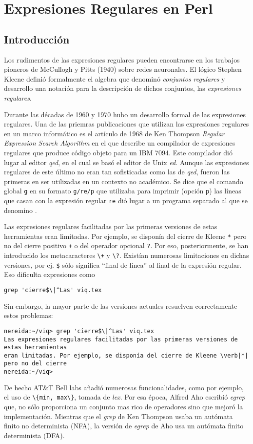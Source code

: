 \chapter{Expresiones Regulares en Perl}
\label{chapter:regulares}

\section{Introducción}
Los rudimentos de las expresiones regulares pueden encontrarse
en los trabajos pioneros de McCullogh y Pitts (1940) sobre redes neuronales.
El lógico Stephen Kleene definió formalmente el algebra que denominó
\emph{conjuntos regulares} y desarrollo una notación para la descripción de dichos conjuntos, las \emph{expresiones regulares}.

Durante las décadas de 1960 y 1970 hubo un desarrollo formal de las expresiones regulares.
Una de las priemras publicaciones que utilizan las expresiones
regulares en un marco informático es el artículo de 1968 de Ken
Thompson \emph{Regular Expression Search Algorithm} en el que describe
un compilador de expresiones regulares que produce código objeto para
un IBM 7094.
Este compilador dió lugar al editor \emph{qed}, en el cual se basó el
editor de Unix
\emph{ed}. Aunque las expresiones regulares de este último no eran
tan sofisticadas como las de \emph{qed}, fueron las primeras en ser
utilizadas en un contexto no académico.
Se dice que el comando global \verb|g| en su formato \verb|g/re/p| que utilizaba 
para imprimir (opción \verb|p|) las líneas que casan con la expresión regular  \verb|re|
dió lugar a un programa separado al que se denomino .

Las expresiones regulares facilitadas por las primeras versiones de estas herramientas 
eran limitadas. Por ejemplo, se disponía del cierre de Kleene \verb|*| pero no del cierre
positivo \verb|+| o del operador opcional \verb|?|. 
Por eso, posteriormente, se han introducido los metacaracteres \verb|\+| y \verb|\?|.
Existían numerosas limitaciones en dichas versiones, por ej. \verb|$| sólo significa ``final
de línea'' al final de la expresión regular. Eso  dificulta expresiones como 
\begin{verbatim}
grep 'cierre$\|^Las' viq.tex
\end{verbatim}
Sin embargo, la mayor parte de las versiones
actuales resuelven correctamente estos problemas:
\begin{verbatim}
nereida:~/viq> grep 'cierre$\|^Las' viq.tex
Las expresiones regulares facilitadas por las primeras versiones de estas herramientas
eran limitadas. Por ejemplo, se disponía del cierre de Kleene \verb|*| pero no del cierre
nereida:~/viq>
\end{verbatim}
De hecho AT\&T Bell  labs añadió numerosas funcionalidades,
como por ejemplo, el uso de \verb|\{min, max\}|, tomada de \emph{lex}.
Por esa época, Alfred Aho escribió \emph{egrep} que, no sólo proporciona un conjunto
mas rico de operadores sino que mejoró la implementación.
Mientras que el \emph{grep} de Ken Thompson usaba un autómata finito no determinista
(NFA), la versión de \emph{egrep}
de Aho usa un autómata finito determinista (DFA).

